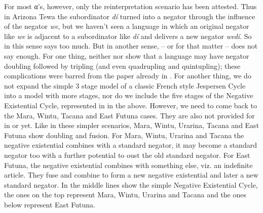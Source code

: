 ﻿\documentclass[output=paper]{langsci/langscibook}
\begin{document}
For most α's, however, only the reinterpretation scenario has been
attested. Thus in Arizona Tewa the subordinator \textit{dí} turned into a
negator through the influence of the negator \textit{we}, but we haven't
seen a language in which an original negator like \textit{we} is adjacent
to a subordinator like \textit{dí} and delivers a new negator
\textit{wedí}. So in this sense  says too much. But in
another sense,  -- or
 for that matter -- does
not say enough. For one thing, neither  nor
show that a language may have negator doubling followed by tripling (and
even quadrupling and quintupling); these complications were barred from the
paper already in . For another thing, we do not expand
the simple 3 stage model of a classic French style Jespersen Cycle into a
model with more stages, nor do we include the five stages of the Negative
Existential Cycle, represented in  in the above.
However, we need to come back to the Mara, Wintu,
Tacana and East Futuna cases. They are also not
provided for in  or
 yet. Like
in these simpler scenarios, Mara, Wintu, Urarina, Tacana and East Futuna
show doubling and fusion. For Mara, Wintu, Urarina and Tacana the negative
existential combines with a standard negator, it may become a standard
negator too with a further potential to oust the old standard negator. For
East Futuna, the negative existential combines with something else, viz. an
indefinite article. They fuse and combine to form a new negative
existential and later a new standard negator. In  the middle
lines show the simple Negative Existential Cycle, the ones on the top
represent Mara, Wintu, Urarina and Tacana and the ones below represent East
Futuna.
\end{document}

